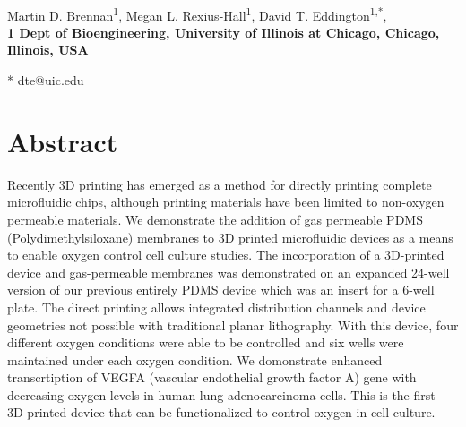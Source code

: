 \documentclass[10pt,letterpaper]{article}
\date{}
\begin{document}
\vspace*{0.35in}

\begin{flushleft}
{\Large
\textbf{}
}
\newline
\\
Martin D. Brennan\textsuperscript{1},
Megan L. Rexius-Hall\textsuperscript{1},
David T. Eddington\textsuperscript{1,*},
\\
\bigskip
\bf{1} Dept of Bioengineering, University of Illinois at Chicago, Chicago, Illinois, USA
\\
\bigskip

* dte@uic.edu

\end{flushleft}
\section*{Abstract}
Recently 3D printing has emerged as a method for directly printing complete microfluidic chips, although printing materials have been limited to non-oxygen permeable materials.
We demonstrate the addition of gas permeable PDMS (Polydimethylsiloxane) membranes to 3D printed microfluidic devices as a means to enable oxygen control cell culture studies.
The incorporation of a 3D-printed device and gas-permeable membranes was demonstrated on an expanded 24-well version of our previous entirely PDMS device which was an insert for a 6-well plate.
The direct printing allows integrated distribution channels and device geometries not possible with traditional planar lithography.
With this device, four different oxygen conditions were able to be controlled and six wells were maintained under each oxygen condition. 
We domonstrate enhanced transcrtiption of VEGFA (vascular endothelial growth factor A) gene with decreasing oxygen levels in human lung adenocarcinoma cells.
This is the first 3D-printed device that can be functionalized to control oxygen in cell culture.

\linenumbers
\end{document}
